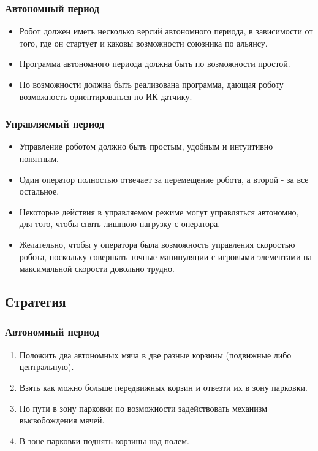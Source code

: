 \documentclass[12pt]{article}
\begin{document}
	\subsubsection{Автономный период}
	  \begin{itemize}
	  	\item Робот должен иметь несколько версий автономного периода, в зависимости от того, где он стартует и каковы возможности союзника по альянсу.
	  	\item Программа автономного периода должна быть по возможности простой.
	  	\item По возможности должна быть реализована программа, дающая роботу возможность ориентироваться по ИК-датчику.
	  \end{itemize}
	  \subsubsection{Управляемый период}
	    \begin{itemize}
	    	\item Управление роботом должно быть простым, удобным и интуитивно понятным.
	    	\item Один оператор полностью отвечает за перемещение робота, а второй - за все остальное.
	    	\item Некоторые действия в управляемом режиме могут управляться автономно, для того, чтобы снять лишнюю нагрузку с оператора.
	    	\item Желательно, чтобы у оператора была возможность управления скоростью робота, поскольку совершать точные манипуляции с игровыми элементами на максимальной скорости довольно трудно.
	    \end{itemize}
	  \subsection{Стратегия} 
	     \subsubsection{Автономный период}
	       \begin{enumerate}
	       	\item Положить два автономных мяча в две разные корзины (подвижные либо центральную).
	       	\item Взять как можно больше передвижных корзин и отвезти их в зону парковки.
	       	\item По пути в зону парковки по возможности задействовать механизм высвобождения мячей.
	       	\item В зоне парковки поднять корзины над полем.      	
	       \end{enumerate}
\end{document}
